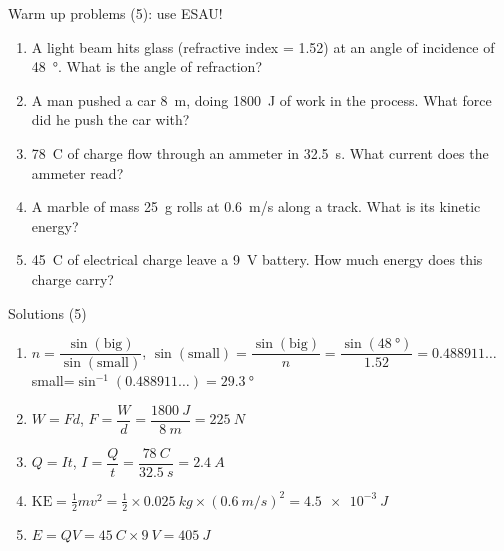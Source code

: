 \documentclass[14pt]{beamer}
\begin{document}
\begin{frame}{Warm up problems (5): use ESAU!}
\vspace*{-0.8em}\begin{enumerate}
\item\label{15.3} A light beam hits glass (refractive index = 1.52) at an angle of incidence of \SI{48}{\degree}.  What is the angle of refraction?
\item\label{5.2} A man pushed a car \SI{8}{m}, doing \SI{1800}{J} of work in the process.  What force did he push the car with?
\item\label{10.2} \SI{78}{C} of charge flow through an ammeter in \SI{32.5}{s}.  What current does the ammeter read?
\item\label{6.1} A marble of mass \SI{25}{g} rolls at \SI{0.6}{m/s} along a track.  What is its kinetic energy?
\item\label{13.1} \SI{45}{C} of electrical charge leave a \SI{9}{V} battery.  How much energy does this charge carry?
\end{enumerate}
\end{frame}

\begin{frame}{Solutions (5)}
\vspace*{-0.8em}\begin{enumerate}
\item\label{15.3} $n=\dfrac{\sin(\text{big})}{\sin(\text{small})}$, $\sin(\text{small})=\dfrac{\sin(\text{big})}{n}=\dfrac{\sin(\SI{48}{\degree})}{1.52}=0.488911\ldots$\\
small=$\sin^{-1}(0.488911\ldots)=\SI{29.3}{\degree}$
\item\label{5.2} $W=Fd$, $F=\dfrac{W}{d}=\dfrac{\SI{1800}{J}}{\SI{8}{m}}=\SI{225}{N}$
\item\label{10.2} $Q=It$, $I=\dfrac{Q}{t}=\dfrac{\SI{78}{C}}{\SI{32.5}{s}}=\SI{2.4}{A}$
\item\label{6.1} $\text{KE}=\frac{1}{2}mv^{2}=\frac{1}{2}\times\SI{0.025}{kg}\times(\SI{0.6}{m/s})^2=\SI{4.5e-3}{J}$
\item\label{13.1} $E=QV=\SI{45}{C}\times\SI{9}{V}=\SI{405}{J}$
\end{enumerate}
\end{frame}
\end{document}
